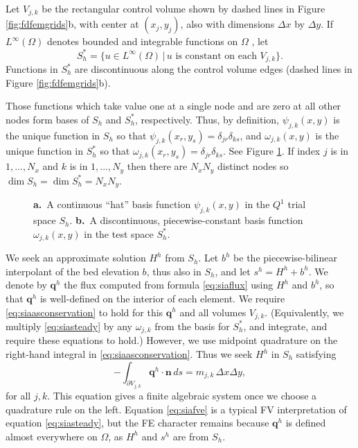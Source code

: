 \documentclass[twocolumn]{igs}
\newcommand\bn{\mathbf{n}}
\newcommand\bq{\mathbf{q}}
\begin{document}
Let $V_{j,k}$ be the rectangular control volume shown by dashed lines in Figure \ref{fig:fdfemgrids}b, with center at $(x_j,y_j)$, also with dimensions $\Delta x$ by $\Delta y$.  If $L^\infty(\Omega)$ denotes bounded and integrable functions on $\Omega$ \cite{Evans}, let
\begin{equation}
S_h^* = \{u \in L^\infty(\Omega) \,\big|\, u \text{ is constant on each $V_{j,k}$}\}.
\end{equation}
Functions in $S_h^*$ are discontinuous along the control volume edges (dashed lines in Figure \ref{fig:fdfemgrids}b).

Those functions which take value one at a single node and are zero at all other nodes form bases of $S_h$ and $S_h^*$, respectively.  Thus, by definition, $\psi_{j,k}(x,y)$ is the unique function in $S_h$ so that $\psi_{j,k}(x_r,y_s) = \delta_{jr} \delta_{ks}$, and $\omega_{j,k}(x,y)$ is the unique function in $S_h^*$  so that $\omega_{j,k}(x_r,y_s) = \delta_{jr} \delta_{ks}$.  See Figure \ref{fig:fembases}.  If index $j$ is in $1,\dots,N_x$ and $k$ is in $1,\dots,N_y$ then there are $N_xN_y$ distinct nodes so $\dim S_h = \dim S_h^* = N_x N_y$.  

\begin{figure}[ht]
\begin{center}
 \quad 
\end{center}
\caption{{\large \textbf{a.}}~A continuous ``hat'' basis function $\psi_{j,k}(x,y)$ in the $Q^1$ trial space $S_h$.  {\large \textbf{b.}}~A discontinuous, piecewise-constant basis function $\omega_{j,k}(x,y)$ in the test space $S_h^*$.}
\label{fig:fembases}
\end{figure}

We seek an approximate solution $H^h$ from $S_h$.  Let $b^h$ be the piecewise-bilinear interpolant of the bed elevation $b$, thus also in $S_h$, and let $s^h=H^h+b^h$.  We denote by $\bq^h$ the flux computed from formula \eqref{eq:siaflux} using $H^h$ and $b^h$, so that $\bq^h$ is well-defined on the interior of each element.  We require \eqref{eq:siaasconservation} to hold for this $\bq^h$ and all volumes $V_{j,k}$.  (Equivalently, we multiply \eqref{eq:siasteady} by any $\omega_{j,k}$ from the basis for $S_h^*$, and integrate, and require these equations to hold.)  However, we use midpoint quadrature on the right-hand integral in \eqref{eq:siaasconservation}.  Thus we seek $H^h$ in $S_h$ satisfying
\begin{equation}
  - \int_{\partial V_{j,k}} \bq^h \cdot \bn\,ds = m_{j,k}\, \Delta x \Delta y, \label{eq:siafve}
\end{equation}
for all $j,k$.  This equation gives a finite algebraic system once we choose a quadrature rule on the left.  Equation \eqref{eq:siafve} is a typical FV interpretation of equation \eqref{eq:siasteady}, but the FE character remains because $\bq^h$ is defined almost everywhere on $\Omega$, as $H^h$ and $s^h$ are from $S_h$.
\end{document}
